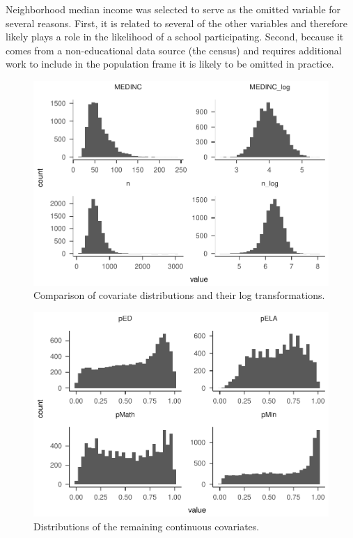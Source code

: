 \documentclass[floatsintext,man]{apa6}
\theoremstyle{definition}
\theoremstyle{definition}
\theoremstyle{definition}
\theoremstyle{remark}
\begin{document}
Neighborhood median income was selected to serve as the omitted variable
for several reasons. First, it is related to several of the other
variables and therefore likely plays a role in the likelihood of a
school participating. Second, because it comes from a non-educational
data source (the census) and requires additional work to include in the
population frame it is likely to be omitted in practice.

\begin{figure}
\centering
\includegraphics{Method_files/figure-latex/dists-1.pdf}
\caption{\label{fig:dists}Comparison of covariate distributions and their
log transformations.}
\end{figure}

\begin{figure}
\centering
\includegraphics{Method_files/figure-latex/dists2-1.pdf}
\caption{\label{fig:dists2}Distributions of the remaining continuous
covariates.}
\end{figure}
\end{document}
